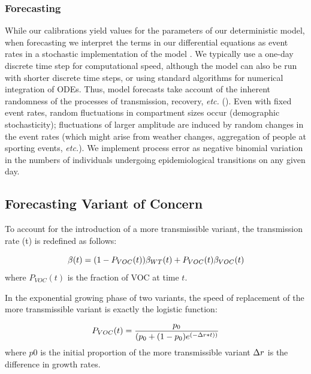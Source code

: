 \documentclass[12pt]{article}\usepackage[]{graphicx}\usepackage[]{color}
\begin{document}
\subsubsection*{Forecasting}

While our calibrations yield values for the parameters of our
deterministic model, when forecasting we interpret the terms in our
differential equations as event rates in a stochastic implementation
of the model \cite{Gill76,Gill01,Gill07}. We typically use a one-day
discrete time step for computational speed, although the model can
also be run with shorter discrete time steps, or using standard
algorithms for numerical integration of ODEs.  Thus, model forecasts
take account of the inherent randomness of the processes of
transmission, recovery, \emph{etc.}  ().  Even
with fixed event rates, random fluctuations in compartment sizes occur
(demographic stochasticity); fluctuations of larger amplitude are
induced by random changes in the event rates (which might arise from
weather changes, aggregation of people at sporting events,
\emph{etc.}). We implement
process error as negative binomial variation in the numbers of
individuals undergoing epidemiological transitions on any given
day.

\subsection*{Forecasting Variant of Concern}

To account for the introduction of a more transmissible variant, the transmission rate \B(t) is redefined as follows:

\begin{equation}
\beta(t) = (1 -  P_{VOC}(t))\beta_{WT}(t) + P_{VOC}(t)\beta_{VOC}(t)
\end{equation}
where $P_{VOC}(t)$ is the fraction of VOC at time $t$.

In the exponential growing phase of two variants, the speed of replacement of the more transmissible variant is exactly the logistic function:

\begin{equation}
P_{VOC}(t) = \frac{p_0}{(p_0+(1-p_0)e^{(-\Delta r*t))}}
\end{equation}
where $p0$ is the initial proportion of the more transmissible variant $\Delta r$ is the difference in growth rates.
\end{document}
